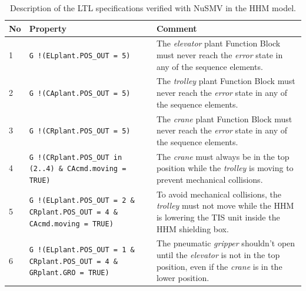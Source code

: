 \begin{bibunit}
\begin{table}[!hb]
    \centering\small
    \renewcommand{\arraystretch}{1.5}
    \begin{tabularx}{\textwidth}{ m{} m{} m{} }
        \hline
        No & Property & Comment                                                                         \\ 
        \hline
        1   & \texttt{G !(ELplant.POS\_OUT = 5)} &  
        The \textit{elevator} plant Function Block must never reach the \textit{error} state in any of the sequence elements.                                                 
        \\ 
        2   & \texttt{G !(CAplant.POS\_OUT = 5)} &  
        The \textit{trolley} plant Function Block must never reach the \textit{error} state in any of the sequence elements.                                                       
        \\ 
        3   & \texttt{G !(CRplant.POS\_OUT = 5)} &                                                    The \textit{crane} plant Function Block must never reach the \textit{error} state in any of the sequence elements.                                                       
        \\ 
        4   & \texttt{G !(CRplant.POS\_OUT in (2..4) \& CAcmd.moving = TRUE)} &                       
        The \textit{crane} must always be in the top position while the \textit{trolley} is moving to prevent mechanical collisions.
        \\      
        5   & \texttt{G !(ELplant.POS\_OUT = 2 \& CRplant.POS\_OUT = 4 \& CAcmd.moving = TRUE)} &     
        To avoid mechanical collisions, the \textit{trolley} must not move while the HHM is lowering the TIS unit inside the HHM shielding box.      
        \\ 
        6   & \texttt{G !(ELplant.POS\_OUT = 1 \& CRplant.POS\_OUT = 4 \& GRplant.GRO = TRUE)} &      
        The pneumatic \textit{gripper} shouldn't open until the \textit{elevator} is not in the top position, even if the \textit{crane} is in the lower position.       
        \\ 
        \hline
    \end{tabularx}
    \caption{Description of the LTL specifications verified with NuSMV in the HHM model.}
    \label{table:1}
\end{table}


\end{bibunit}
